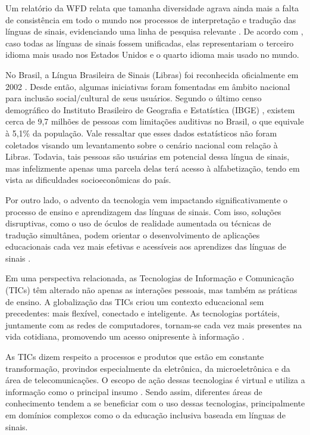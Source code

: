 Um relatório da WFD relata que tamanha diversidade agrava ainda mais a falta de consistência em todo o mundo nos processos de interpretação e tradução das línguas de sinais, evidenciando uma linha de pesquisa relevante \cite{Napier2019}. De acordo com , caso todas as línguas de sinais fossem unificadas, elas representariam o terceiro idioma mais usado nos Estados Unidos e o quarto idioma mais usado no mundo.

No Brasil, a Língua Brasileira de Sinais (Libras) foi reconhecida oficialmente em 2002 \cite{Honora2017,Quadros2019}. Desde então, algumas iniciativas foram fomentadas em âmbito nacional para inclusão social/cultural de seus usuários. Segundo o último censo demográfico do Instituto Brasileiro de Geografia e Estatística (IBGE) \cite{IBGE2010}, existem cerca de 9,7 milhões de pessoas com limitações auditivas no Brasil, o que equivale à 5,1\% da população. Vale ressaltar que esses dados estatísticos não foram coletados visando um levantamento sobre o cenário nacional com relação à Libras. Todavia, tais pessoas são usuárias em potencial dessa língua de sinais, mas infelizmente apenas uma parcela delas terá acesso à alfabetização, tendo em vista as dificuldades socioeconômicas do país.

Por outro lado, o advento da tecnologia vem impactando significativamente o processo de ensino e aprendizagem das línguas de sinais. Com isso, soluções disruptivas, como o uso de óculos de realidade aumentada ou técnicas de tradução simultânea, podem orientar o desenvolvimento de aplicações educacionais cada vez mais efetivas e acessíveis aos aprendizes das línguas de sinais \cite{Napier2019}.

Em uma perspectiva relacionada, as Tecnologias de Informação e Comunicação (TICs) têm alterado não apenas as interações pessoais, mas também as práticas de ensino. A globalização das TICs criou um contexto educacional sem precedentes: mais flexível, conectado e inteligente. As tecnologias portáteis, juntamente com as redes de computadores, tornam-se cada vez mais presentes na vida cotidiana, promovendo um acesso onipresente à informação \cite{Cilli2017}.

As TICs dizem respeito a processos e produtos que estão em constante transformação, provindos especialmente da eletrônica, da microeletrônica e da área de telecomunicações. O escopo de ação dessas tecnologias é virtual e utiliza a informação como o principal insumo \cite{Cilli2017}. Sendo assim, diferentes áreas de conhecimento tendem a se beneficiar com o uso dessas tecnologias, principalmente em domínios complexos como o da educação inclusiva baseada em línguas de sinais.

